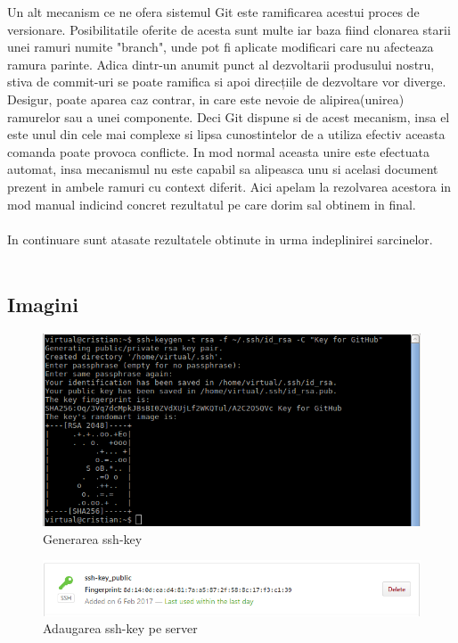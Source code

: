 Un alt mecanism ce ne ofera sistemul Git este ramificarea acestui proces de versionare. Posibilitatile oferite de acesta sunt multe iar baza fiind clonarea starii unei ramuri numite "branch", unde pot fi aplicate modificari care nu afecteaza ramura parinte. Adica dintr-un anumit punct al dezvoltarii produsului nostru, stiva de commit-uri se poate ramifica si apoi direcțiile de dezvoltare vor diverge. Desigur, poate aparea caz contrar, in care este nevoie de alipirea(unirea) ramurelor sau a unei componente. Deci Git dispune si de acest mecanism, insa el este unul din cele mai complexe si lipsa cunostintelor de a utiliza efectiv aceasta comanda poate provoca conflicte. In mod normal aceasta unire este efectuata automat, insa mecanismul nu este capabil sa alipeasca unu si acelasi document prezent in ambele ramuri cu context diferit. Aici apelam la rezolvarea acestora in mod manual indicind concret rezultatul pe care dorim sal obtinem in final.
\\
\\In continuare sunt atasate rezultatele obtinute in urma indeplinirei sarcinelor.
\\
\\



\subsection{Imagini}
\begin{figure}[htb]
	\begin{center}
		\centering
		\includegraphics[scale = 0.9]{img/ssh_key.png}
		\caption{Generarea ssh-key}%
		\label{fig:generarea_ssh_key}
	\end{center}
\end{figure}

\begin{figure}[htb]
	\begin{center}
		\centering
		\includegraphics[scale = 0.8]{img/add_key_onserver.png}
		\caption{Adaugarea ssh-key pe server}%
		\label{fig:add_key_onserver}
	\end{center}
\end{figure}

